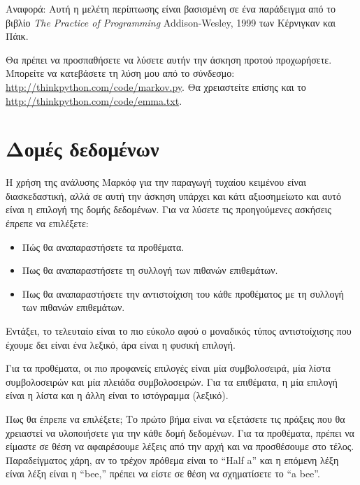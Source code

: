 \documentclass[10pt]{book}
\begin{document}
\begin{exercise}
\begin{enumerate}
\end{enumerate}

Αναφορά: Αυτή η μελέτη περίπτωσης είναι βασισμένη σε ένα παράδειγμα από το βιβλίο {\em The Practice of Programming} Addison-Wesley, 1999 των Κέρνιγκαν και Πάικ.

Θα πρέπει να προσπαθήσετε να λύσετε αυτήν την άσκηση προτού προχωρήσετε. Μπορείτε να κατεβάσετε τη λύση μου από το σύνδεσμο: \url{http://thinkpython.com/code/markov.py}. Θα χρειαστείτε επίσης και το \url{http://thinkpython.com/code/emma.txt}.
\end{exercise}


\section{Δομές δεδομένων}

Η χρήση της ανάλυσης Μαρκόφ για την παραγωγή τυχαίου κειμένου είναι διασκεδαστική, αλλά σε αυτή την άσκηση υπάρχει και κάτι αξιοσημείωτο και αυτό είναι η επιλογή της δομής δεδομένων. Για να λύσετε τις προηγούμενες ασκήσεις έπρεπε να επιλέξετε:

\begin{itemize}

\item  Πώς θα αναπαραστήσετε τα προθέματα. 

\item  Πως θα αναπαραστήσετε τη συλλογή των πιθανών επιθεμάτων. 

\item  Πως θα αναπαραστήσετε την αντιστοίχιση του κάθε προθέματος με τη συλλογή των πιθανών επιθεμάτων. 

\end{itemize}

 
Εντάξει, το τελευταίο είναι το πιο εύκολο αφού ο μοναδικός τύπος αντιστοίχισης που έχουμε δει είναι ένα λεξικό, 
άρα είναι η φυσική επιλογή.

Για τα προθέματα, οι πιο προφανείς επιλογές είναι μία συμβολοσειρά, μία λίστα συμβολοσειρών και μία πλειάδα συμβολοσειρών. Για τα επιθέματα, η μία επιλογή είναι η λίστα και η άλλη είναι το ιστόγραμμα (λεξικό).

Πως θα έπρεπε να επιλέξετε; Το πρώτο βήμα είναι να εξετάσετε τις πράξεις που θα χρειαστεί να υλοποιήσετε για την 
κάθε δομή δεδομένων. Για τα προθέματα, πρέπει να είμαστε σε θέση να αφαιρέσουμε λέξεις από την αρχή και να προσθέσουμε στο τέλος. Παραδείγματος χάρη, αν το τρέχον πρόθεμα είναι το ``Half a'' και η επόμενη λέξη είναι λέξη είναι η ``bee,'' πρέπει να είστε σε θέση να σχηματίσετε το ``a bee''.
\end{document}
